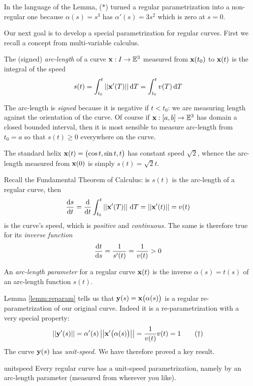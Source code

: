 In the language of the Lemma, ($\ast$) turned a regular parametrization into a non-regular one because $\alpha(s)=s^3$ has $\alpha'(s)=3s^2$ which is zero at $s=0$.\bigbreak

Our next goal is to develop a special parametrization for regular curves. First we recall a concept from multi-variable calculus.

\begin{defn}{}{}
	The (signed) \emph{arc-length} of a curve $\vx:I\to\E^3$ measured from $\vx(t_0)$ to $\vx(t)$ is the integral of the speed
	\[
		s(t)=\int_{t_0}^t\Nm{\vx'(T)}\D T =\int_{t_0}^tv(T)\,\D T
	\]
\end{defn}

The arc-length is \emph{signed} because it is negative if $t<t_0$: we are measuring length against the orientation of the curve. Of course if $\vx:[a,b]\to\E^3$ has domain a closed bounded interval, then it is most sensible to measure arc-length from $t_0=a$ so that $s(t)\ge 0$ everywhere on the curve.

\begin{example}{}{}
	The standard helix $\vx(t)=\bigl(\cos t,\sin t,t\bigr)$ has constant speed $\sqrt 2$, whence the arc-length measured from $\vx(0)$ is simply $s(t)=\sqrt 2t$.
\end{example}

Recall the Fundamental Theorem of Calculus: is $s(t)$ is the arc-length of a regular curve, then
\[
	\diff[s]{t}=\diff t\int_{t_0}^t\Nm{\vx'(T)}\,\D T=\Nm{\vx'(t)}=v(t)
\]
is the curve's speed, which is \emph{positive} and \emph{continuous.} The same is therefore true for its \emph{inverse function}
\[
	\diff[t]{s}=\frac 1{s'(t)}=\frac 1{v(t)}>0
\]

\begin{defn}{}{}
	An \emph{arc-length parameter} for a regular curve $\vx(t)$ is the inverse $\alpha(s)=t(s)$ of an arc-length function $s(t)$.
\end{defn}

Lemma \ref{lemm:reparam} tells us that $\vy(s)=\vx\bigl(\alpha(s)\bigr)$ is a regular re-parametrization of our original curve. Indeed it is a re-parametrization with a very special property:
\[
	\Nm{\vy'(s)}=\alpha'(s)\Nm{\vx'\bigl(\alpha(s)\bigr)}=\frac 1{v(t)}v(t)=1 \tag{$\dag$}
\]
The curve $\vy(s)$ has \emph{unit-speed.} We have therefore proved a key result.

\begin{thm}{}{unitspeed}
	Every regular curve has a unit-speed parametrization, namely by an arc-length parameter  (measured from wherever you like).
\end{thm}

